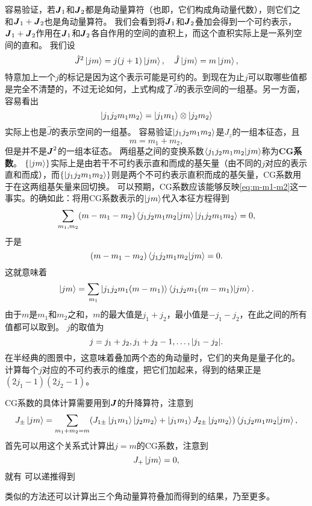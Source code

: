\documentclass[hyperref, UTF8, a4paper]{ctexart}
\begin{document}
容易验证，若$\vb*{J}_1$和$\vb*{J}_2$都是角动量算符（也即，它们构成角动量代数），则它们之和$\vb*{J}_1 + \vb*{J}_2$也是角动量算符。
我们会看到将$\vb*{J}_1$和$\vb*{J}_2$叠加会得到一个可约表示，$\vb*{J}_1 + \vb*{J}_2$作用在$\vb*{J}_1$和$\vb*{J}_2$各自作用的空间的直积上，而这个直积实际上是一系列空间的直和。
我们设
\[
    \hat{J}^2 \ket{jm} = j(j+1) \ket{jm}, \quad \hat{J} \ket{jm} = m \ket{jm},
\]
特意加上一个$j$的标记是因为这个表示可能是可约的。到现在为止$j$可以取哪些值都是完全不清楚的，不过无论如何，上式构成了$\hat{J}$的表示空间的一组基。另一方面，容易看出
\[
    \ket{j_1 j_2 m_1 m_2} = \ket{j_1 m_1} \otimes \ket{j_2 m_2}
\]
实际上也是$\hat{J}$的表示空间的一组基。
容易验证$\ket{j_1 j_2 m_1 m_2}$是$J_z$的一组本征态，且
\begin{equation}
    m = m_1 + m_2,
    \label{eq:m-m1-m2}
\end{equation}
但是并不是$\vb*{J}^2$的一组本征态。
两组基之间的变换系数$\braket{j_1 j_2 m_1 m_2}{j m}$称为\textbf{CG系数}。
$\{\ket{jm}\}$实际上是由若干不可约表示直和而成的基矢量（由不同的$j$对应的表示直和而成），而$\{\ket{j_1 j_2 m_1 m_2}\}$则是两个不可约表示直积而成的基矢量，CG系数用于在这两组基矢量来回切换。
可以预期，CG系数应该能够反映\eqref{eq:m-m1-m2}这一事实。的确如此：将用CG系数表示的$\ket{jm}$代入本征方程得到
\[
    \sum_{m_1, m_2} (m - m_1 - m_2) \braket{j_1 j_2 m_1 m_2}{j m} \ket{j_1 j_2 m_1 m_2} = 0,
\]
于是
\[
    (m - m_1 - m_2) \braket{j_1 j_2 m_1 m_2}{j m} = 0.
\]
这就意味着
\[
    \ket{jm} = \sum_{m_1} \ket{j_1 j_2 m_1 (m-m_1)} \braket{j_1 j_2 m_1 (m-m_1)}{jm}.
\]
由于$m$是$m_1$和$m_2$之和，$m$的最大值是$j_1+j_2$，最小值是$-j_1-j_2$，在此之间的所有值都可以取到。
$j$的取值为
\[
    j = j_1 + j_2, j_1 + j_2 - 1, \ldots, \abs{j_1 - j_2}.
\]
在半经典的图景中，这意味着叠加两个态的角动量时，它们的夹角是量子化的。
计算每个$j$对应的不可约表示的维度，把它们加起来，得到的结果正是$(2j_1 - 1) (2j_2 - 1)$。

CG系数的具体计算需要用到$\vb*{J}$的升降算符，注意到
\begin{equation}
    J_{\pm} \ket{jm} = \sum_{m_1 + m_2 = m} (J_{1 \pm} \ket{j_1 m_1} \ket{j_2 m_2} + \ket{j_1 m_1} J_{2 \pm} \ket{j_2 m_2}) \braket{j_1 j_2 m_1 m_2}{jm},
    \label{eq:addition-of-ca-opearator-su2}
\end{equation}
首先可以用这个关系式计算出$j=m$的CG系数，注意到
\[
    J_+ \ket{jm} = 0,
\]
就有
可以递推得到

类似的方法还可以计算出三个角动量算符叠加而得到的结果，乃至更多。

\end{document}
